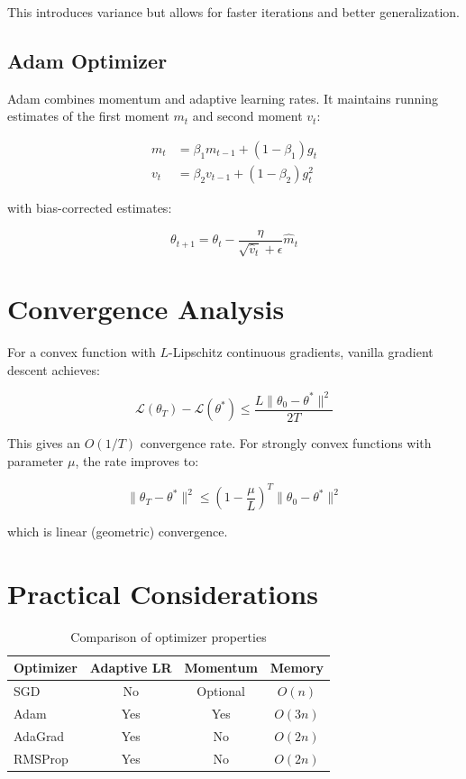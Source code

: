 \documentclass[conference]{IEEEtran}
\begin{document}
This introduces variance but allows for faster iterations and better generalization.

\subsection{Adam Optimizer}

Adam \cite{kingma2015adam} combines momentum and adaptive learning rates. It maintains running estimates of the first moment $m_t$ and second moment $v_t$:

\begin{align}
m_t &= \beta_1 m_{t-1} + (1 - \beta_1) g_t \\
v_t &= \beta_2 v_{t-1} + (1 - \beta_2) g_t^2
\end{align}

with bias-corrected estimates:

\begin{equation}
\theta_{t+1} = \theta_t - \frac{\eta}{\sqrt{\hat{v}_t} + \epsilon} \hat{m}_t
\end{equation}

\section{Convergence Analysis}

For a convex function with $L$-Lipschitz continuous gradients, vanilla gradient descent achieves:

\begin{equation}
\mathcal{L}(\theta_T) - \mathcal{L}(\theta^*) \leq \frac{L \|\theta_0 - \theta^*\|^2}{2T}
\end{equation}

This gives an $O(1/T)$ convergence rate. For strongly convex functions with parameter $\mu$, the rate improves to:

\begin{equation}
\|\theta_T - \theta^*\|^2 \leq \left(1 - \frac{\mu}{L}\right)^T \|\theta_0 - \theta^*\|^2
\end{equation}

which is linear (geometric) convergence.

\section{Practical Considerations}

\begin{table}[h]
\centering
\caption{Comparison of optimizer properties}
\begin{tabular}{lccc}
\toprule
\textbf{Optimizer} & \textbf{Adaptive LR} & \textbf{Momentum} & \textbf{Memory} \\
\midrule
SGD & No & Optional & $O(n)$ \\
Adam & Yes & Yes & $O(3n)$ \\
AdaGrad & Yes & No & $O(2n)$ \\
RMSProp & Yes & No & $O(2n)$ \\
\bottomrule
\end{tabular}
\end{table}
\end{document}
